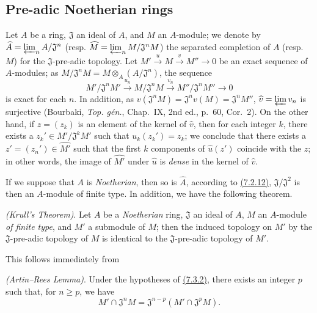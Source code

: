 \subsection{Pre-adic Noetherian rings}
\label{subsection-pre-adic-noetherian-rings}

\begin{env}[7.3.1]
\label{env-0.7.3.1}
Let $A$ be a ring, $\mathfrak{J}$ an ideal of $A$, and $M$ an $A$-module; we denote by
$\widehat{A}=\varprojlim_n A/\mathfrak{J}^n$
(resp. $\widehat{M}=\varprojlim_n M/\mathfrak{J}^n M$) the separated completion of $A$
(resp. $M$) for the $\mathfrak{J}$-pre-adic topology. Let
$M'\xrightarrow{u}M\xrightarrow{v}M''\to 0$ be an exact sequence of $A$-modules; as
$M/\mathfrak{J}^n M=M\otimes_A(A/\mathfrak{J}^n)$, the sequence
\[
  M'/\mathfrak{J}^n M'\xrightarrow{u_n}M/\mathfrak{J}^n M
  \xrightarrow{v_n}M''/\mathfrak{J}^n M''\longrightarrow 0
\]
is exact for each $n$. In addition, as
$v(\mathfrak{J}^n M)=\mathfrak{J}^n v(M)=\mathfrak{J}^n M''$,
$\widehat{v}=\varprojlim v_n$ is surjective (Bourbaki, {\em Top. g\'en.}, Chap.~IX,
2nd ed., p.~60, Cor.~2). On the other hand, if $z=(z_k)$ is an element of the kernel of
$\widehat{v}$, then for each integer $k$, there exists a $z_k'\in M'/\mathfrak{J}^k M'$
such that $u_k(z_k')=z_k$; we conclude that there exists  a $z'=(z_n')\in\widehat{M'}$
such that the first $k$ components of $\widehat{u}(z')$ coincide with the $z$; in other
words, the image of $\widehat{M'}$ under $\widehat{u}$ is {\em dense} in the kernel of
$\widehat{v}$.

If we suppose that $A$ is {\em Noetherian}, then so is $\widehat{A}$, according to
\hyperref[exm-0.7.2.12]{(7.2.12)}, $\mathfrak{J}/\mathfrak{J}^2$ is then an $A$-module of
finite type. In addition, we have the following theorem.
\end{env}

\begin{thm}[7.3.2]
\label{thm-0.7.3.2}
{\em (Krull's Theorem)}. Let $A$ be a {\em Noetherian} ring, $\mathfrak{J}$ an ideal of
$A$, $M$ an $A$-module {\em of finite type}, and $M'$ a submodule of $M$; then the induced
topology on $M'$ by the $\mathfrak{J}$-pre-adic topology of $M$ is identical to the
$\mathfrak{J}$-pre-adic topology of $M'$.
\end{thm}

This follows immediately from
\begin{lem}[7.3.2.1]
\label{lem-0.7.3.2.1}
{\em (Artin--Rees Lemma)}. Under the hypotheses of \hyperref[thm-0.7.3.2]{(7.3.2)}, there
exists an integer $p$ such that, for $n\geqslant p$, we have
\[
  M'\cap\mathfrak{J}^n M=\mathfrak{J}^{n-p}(M'\cap\mathfrak{J}^p M).
\]
\end{lem}

